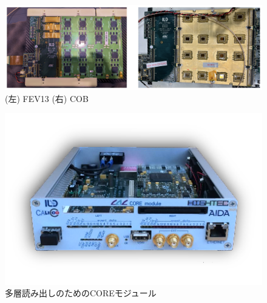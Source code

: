  \begin{figure}[ht]
	\begin{center}
	\includegraphics[keepaspectratio, scale=0.3]
 	{Figure/Siwecal/fevcob.png}
 		\caption{(左) FEV13 (右) COB}
 		\label{fevcob}
	\end{center}
 \end{figure}
 \begin{figure}[ht]
	\begin{center}
	\includegraphics[keepaspectratio, scale=0.7]
 	{Figure/Siwecal/core.png}
 		\caption{多層読み出しのためのCOREモジュール}
 		\label{core}
	\end{center}
 \end{figure}